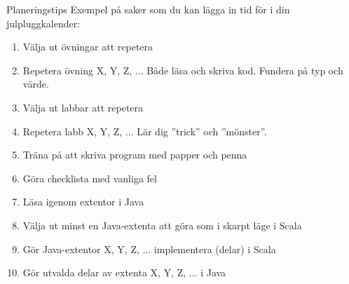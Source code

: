 \begin{Slide}{Planeringstips}\SlideFontTiny
Exempel på saker som du kan lägga in tid för i din julpluggkalender:
\begin{enumerate}
\item Välja ut övningar att repetera
\item Repetera övning X, Y, Z, ... Både läsa och skriva kod. Fundera på typ och värde.
\item Välja ut labbar att repetera
\item Repetera labb X, Y, Z, ... Lär dig ''trick'' och ''mönster''.
\item Träna på att skriva program med papper och penna
\item Göra checklista med vanliga fel
\item Läsa igenom extentor i Java
\item Välja ut minst en Java-extenta att göra som i skarpt läge i Scala
\item Gör Java-extentor X, Y, Z, ... implementera (delar) i Scala
\item Gör utvalda delar av extenta X, Y, Z, ... i Java
\end{enumerate}
\end{Slide}


